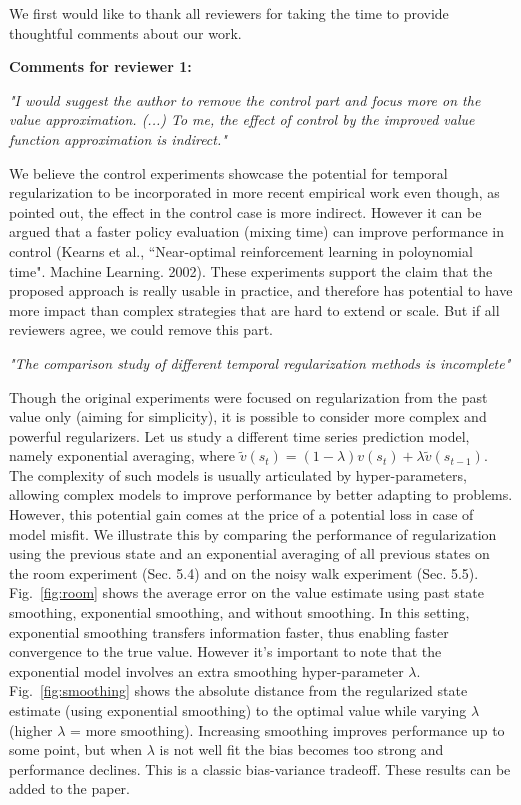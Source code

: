 \documentclass{article}
\begin{document}
We first would like to thank all reviewers for taking the time to provide thoughtful comments about our work.


\textbf{Comments for reviewer 1:}

\textit{"I would suggest the author to remove the control part and focus more on the value approximation. (...) To me, the effect of control by the improved value function approximation is indirect."}


We believe the control experiments showcase the potential for temporal regularization to be incorporated in more recent empirical work even though, as pointed out, the effect in the control case is more indirect. However it can be argued that a faster policy evaluation (mixing time) can improve performance in control (Kearns et al., ``Near-optimal reinforcement learning in poloynomial time". Machine Learning. 2002). These experiments support the claim that the proposed approach is really usable in practice, and therefore has potential to have more impact than complex strategies that are hard to extend or scale.  But if all reviewers agree, we could remove this part.


\textit{"The comparison study of different temporal regularization methods is incomplete"}

Though the original experiments were focused on regularization from the past value only (aiming for simplicity), it is possible to consider more complex and powerful regularizers. Let us study a different time series prediction model, namely exponential averaging, where $    \widetilde{v}(s_t) = (1-\lambda)v(s_t) + \lambda \widetilde{v}(s_{t-1})$. The complexity of such models is usually articulated by hyper-parameters, allowing complex models to improve performance by better adapting to problems. However, this potential gain comes at the price of a potential loss in case of model misfit.
We illustrate this by comparing the performance of regularization using the previous state and an exponential averaging of all previous states on the room experiment (Sec. 5.4) and on the noisy walk experiment (Sec. 5.5).
Fig.~\ref{fig:room} shows the average error on the value estimate using past state smoothing, exponential smoothing, and without smoothing. In this setting, exponential smoothing transfers information faster, thus enabling faster convergence to the true value.
However it's important to note that the exponential model involves an extra smoothing hyper-parameter $\lambda$. Fig.~\ref{fig:smoothing} shows the absolute distance from the regularized state estimate (using exponential smoothing) to the optimal value while varying $\lambda$ (higher $\lambda$ = more smoothing). Increasing smoothing improves performance up to some point, but when $\lambda$ is not well fit the bias becomes too strong and performance declines. This is a classic bias-variance tradeoff. These results can be added to the paper.
\end{document}
